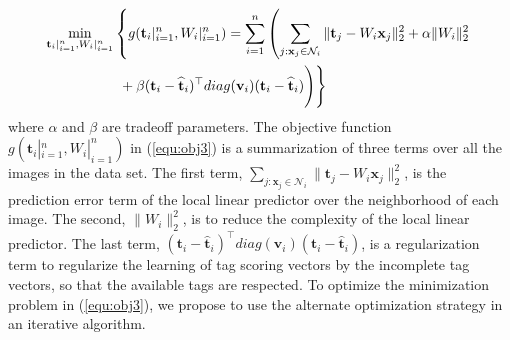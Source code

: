 \documentclass[runningheads,a4paper]{llncs}
\newcommand{\bfx}{{\textbf{x}}}
\newcommand{\bfv}{{\textbf{v}}}
\newcommand{\bft}{{\textbf{t}}}
\begin{document}
\begin{equation}
\label{equ:obj3}
\begin{aligned}
\min_{\bft_i|_{i=1}^n,W_i|_{i=1}^n}
&
\left \{
g(\bft_i|_{i=1}^n,W_i|_{i=1}^n)
\vphantom{\sum_{j:v_{ij}=1}}
 =
\sum_{i=1}^n
\left (
\sum_{j:\bfx_j\in \mathcal{N}_i} \| \bft_j - W_i \bfx_j\|_2^2 + \alpha \|W_i\|_2^2
\right.\right.
\\
&\left .\left .
\vphantom{\sum_{i}^2}
+\beta(\bft_i - \widehat{\bft}_i)^\top diag(\bfv_i) (\bft_i - \widehat{\bft}_i)
\right )
\right \}
\end{aligned}
\end{equation}
where $\alpha$ and $\beta$ are tradeoff parameters. The objective function $g(\bft_i|_{i=1}^n,W_i|_{i=1}^n)$ in (\ref{equ:obj3}) is a summarization of three terms over all the images in the data set. The first term, $\sum_{j:\bfx_j\in \mathcal{N}_i} \| \bft_j - W_i \bfx_j\|_2^2$, is the prediction error term of the local linear predictor over the neighborhood of each image. The second, $\|W_i\|_2^2$, is to reduce the complexity of the local linear predictor. The last term, $(\bft_i - \widehat{\bft}_i)^\top diag(\bfv_i) (\bft_i - \widehat{\bft}_i)$, is a regularization term to regularize the learning of tag scoring vectors by the incomplete tag vectors, so that the available tags are respected.
To optimize the minimization problem in (\ref{equ:obj3}), we propose to use the alternate optimization strategy \cite{Huang2015233,Liu2015188} in an iterative algorithm.
\end{document}
